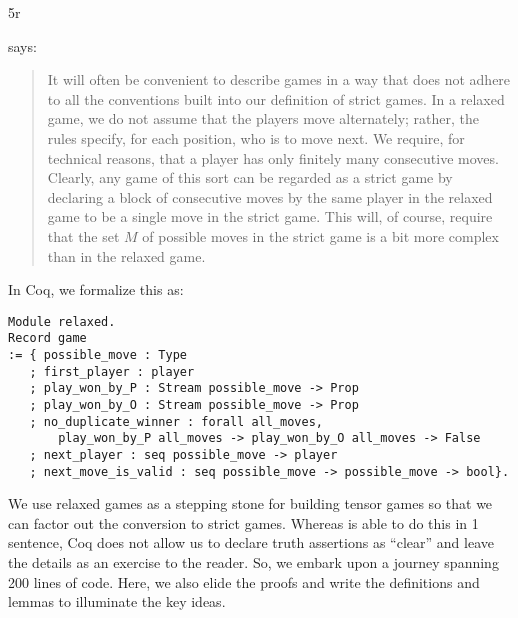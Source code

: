 5r\documentclass{article}
\theoremstyle{definition}
\begin{document}
\textcite[p.~187]{Blass1992} says: 

\begin{quote}
    It will often be convenient to describe games in a way that does not adhere to all the conventions built into our definition of strict games. In a relaxed game, we do not assume that the players move alternately; rather, the rules specify, for each position, who is to move next. We require, for technical reasons, that a player has only finitely many consecutive moves. Clearly, any game of this sort can be regarded as a strict game by declaring a block of consecutive moves by the same player in the relaxed game to be a single move in the strict game. This will, of course, require that the set $M$ of possible moves in the strict game is a bit more complex than in the relaxed game.
\end{quote}

In Coq, we formalize this as:

\begin{verbatim}
Module relaxed.
Record game
:= { possible_move : Type
   ; first_player : player
   ; play_won_by_P : Stream possible_move -> Prop
   ; play_won_by_O : Stream possible_move -> Prop
   ; no_duplicate_winner : forall all_moves, 
       play_won_by_P all_moves -> play_won_by_O all_moves -> False
   ; next_player : seq possible_move -> player 
   ; next_move_is_valid : seq possible_move -> possible_move -> bool}.    
\end{verbatim}

We use relaxed games as a stepping stone for building tensor games so that we can factor out the conversion to strict games. Whereas \textcite{Blass1992} is able to do this in 1 sentence, Coq does not allow us to declare truth assertions as ``clear'' and leave the details as an exercise to the reader. So, we embark upon a journey spanning 200 lines of code. Here, we also elide the proofs and write the definitions and lemmas to illuminate the key ideas. 
\end{document}
